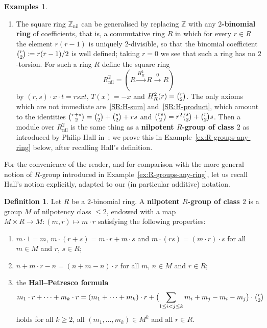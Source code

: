 \documentclass[reqno,a4paper]{amsart}
\renewcommand{\binom}{\tbinom} %
\theoremstyle{plain}
\theoremstyle{definition}
\newtheorem{definition}[subsection]{Definition}
\newtheorem{examples}[subsection]{Examples}
\newcommand{\defn}{\textbf}
\newcommand{\DefEq}{\coloneq}
\newcommand{\Z}{\ensuremath{\mathbb{Z}}}
\DeclareMathOperator{\nil}{nil}
\newcommand{\sqring}[4]{\ensuremath{(#1\xrightarrow{#3}#2\xrightarrow{#4}#1)}}
\begin{document}
\begin{examples}
\begin{enumerate}
    \item\label{ex:R-groups-binomial}
          The square ring \(\Z_{\nil}\) can be generalised by replacing \(\Z\) with any \defn{\(2\)-binomial ring} of coefficients, that is, a commutative ring \(R\) in which for every \(r\in R\) the element \(r(r-1)\) is uniquely \(2\)-divisible, so that the binomial coefficient \(\binom{r}{2}\DefEq r(r-1)/2\) is well defined; taking \(r=0\) we see that such a ring has no \(2\)-torsion. For such a ring \(R\) define the square ring
          \[
            R_{\nil}^{2}=\sqring{R}{R}{H_{R}^{2}}{0}
          \]
          by \((r,s)\cdot x\cdot t=rsxt\), \(T(x)=-x\) and \(H_{R}^{2}(r)=\binom{r}{2}\). The only axioms which are not immediate are~\ref{SR:H-sum} and~\ref{SR:H-product}, which amount to the identities \(\binom{r+s}{2}=\binom{r}{2}+\binom{s}{2}+rs\) and \(\binom{rs}{2}=r^{2}\binom{s}{2}+\binom{r}{2}s\). Then a module over \(R_{\nil}^{2}\) is the same thing as a \defn{nilpotent \(R\)-group of class \(2\)} as introduced by Philip Hall in~\cite{Hall:Edmonton}; we prove this in Example~\ref{ex:R-groups-any-ring} below, after recalling Hall's definition.
  \end{enumerate}
\end{examples}

For the convenience of the reader, and for comparison with the more general notion of \(R\)-group introduced in Example~\ref{ex:R-groups-any-ring}, let us recall Hall's notion explicitly, adapted to our (in particular additive) notation.

\begin{definition}\label{def:hall-R-group}
  Let \(R\) be a \(2\)-binomial ring. A \defn{nilpotent \(R\)-group of class \(2\)} is a group \(M\) of nilpotency class \(\leq 2\), endowed with a map \(M\times R\to M\colon (m,r)\mapsto m\cdot r\) satisfying the following properties:
  \begin{enumerate}
    \item\label{it:hall-action} \(m\cdot 1=m\), \(m\cdot(r+s)=m\cdot r+m\cdot s\) and \(m\cdot(rs)=(m\cdot r)\cdot s\) for all \(m\in M\) and \(r\), \(s\in R\);
    \item\label{it:hall-conjugation} \(n+m\cdot r-n=(n+m-n)\cdot r\) for all \(m\), \(n\in M\) and \(r\in R\);
    \item\label{it:hall-petresco} the \defn{Hall--Petresco formula}
          \[
            m_{1}\cdot r+\cdots+m_{k}\cdot r=(m_{1}+\cdots+m_{k})\cdot r+\bigl(\sum_{1\leq i<j\leq k}m_{i}+m_{j}-m_{i}-m_{j}\bigr)\cdot\binom{r}{2}
          \]
          holds for all \(k\geq 2\), all \((m_{1},\dots,m_{k})\in M^{k}\) and all \(r\in R\).
  \end{enumerate}
\end{definition}
\end{document}
